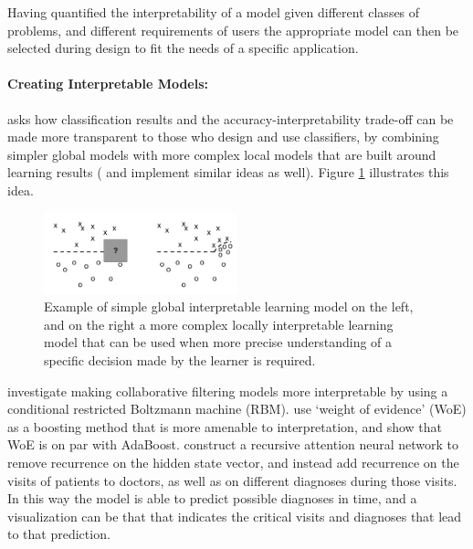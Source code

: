 Having quantified the interpretability of a model given different classes of problems, and different requirements of users the appropriate model can then be selected during design to fit the needs of a specific application.

\paragraph{Creating Interpretable Models:}
\citet{Ruping2006-xj} asks how classification results and the accuracy-interpretability trade-off can be made more transparent to those who design and use classifiers, by combining simpler global models with more complex local models that are built around learning results (\citet{Otte2013-oo} and \citet{Ribeiro2016-uc} implement similar ideas as well). Figure \ref{fig:ruping} illustrates this idea.

\begin{figure}[htbp]
    \centering
    \includegraphics[width=0.5\textwidth]{Figures/global_local}
    \caption{Example of simple global interpretable learning model on the left, and on the right a more complex locally interpretable learning model that can be used when more precise understanding of a specific decision made by the learner is required. }
    \label{fig:ruping}
\end{figure}

\citet{Abdollahi2016-vn} investigate making collaborative filtering models more interpretable by using a conditional restricted Boltzmann machine (RBM). \citet{Ridgeway1998-lv} use `weight of evidence' (WoE) as a boosting method that is more amenable to interpretation, and show that WoE is on par with AdaBoost. \citet{Choi2016-by} construct a recursive attention neural network to remove recurrence on the hidden state vector, and instead add recurrence on the visits of patients to doctors, as well as on different diagnoses during those visits. In this way the model is able to predict possible diagnoses in time, and a visualization can be that that indicates the critical visits and diagnoses that lead to that prediction.

